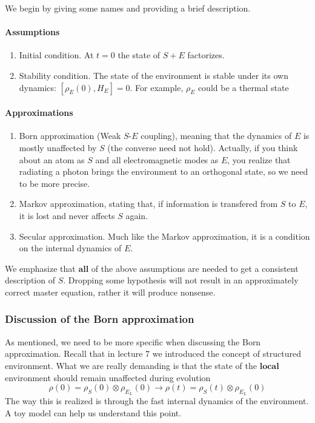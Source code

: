 \documentclass[a4paper, 11pt]{article}
\begin{document}
	We begin by giving some names and providing a brief description.
	\paragraph{Assumptions}
	\begin{enumerate}
		\item Initial condition. At $t=0$ the state of $S+E$ factorizes.
		\item Stability condition. The state of the environment is stable under its own dynamics: $[\rho_E(0), H_E] = 0$. For example, $\rho_E$ could be a thermal state
	\end{enumerate}

	\paragraph{Approximations}
	\begin{enumerate}
		\item Born approximation (Weak $S$-$E$ coupling), meaning that the dynamics of $E$ is mostly unaffected by $S$ (the converse need not hold). Actually, if you think about an atom as $S$ and all electromagnetic modes as $E$, you realize that radiating a photon brings the environment to an orthogonal state, so we need to be more precise.
		\item Markov approximation, stating that, if information is transfered from $S$ to $E$, it is lost and never affects $S$ again.
		\item Secular approximation. Much like the Markov approximation, it is a condition on the internal dynamics of $E$.
	\end{enumerate}
	
	We emphasize that $\mathbf{all}$ of the above assumptions are needed to get a consistent description of $S$. Dropping some hypothesis will not result in an approximately correct master equation, rather it will produce nonsense.
	
	\subsubsection{Discussion of the Born approximation}
	As mentioned, we need to be more specific when discussing the Born approximation. Recall that in lecture 7 we introduced the concept of structured environment. What we are really demanding is that the state of the $\mathbf{local}$ environment should remain unaffected during evolution
	\[ \rho(0) = \rho_S(0) \otimes \rho_{E_L}(0) \rightarrow \rho(t) = \rho_S(t) \otimes \rho_{E_L}(0) \]
	The way this is realized is through the fast internal dynamics of the environment. A toy model can help us understand this point.
\end{document}
